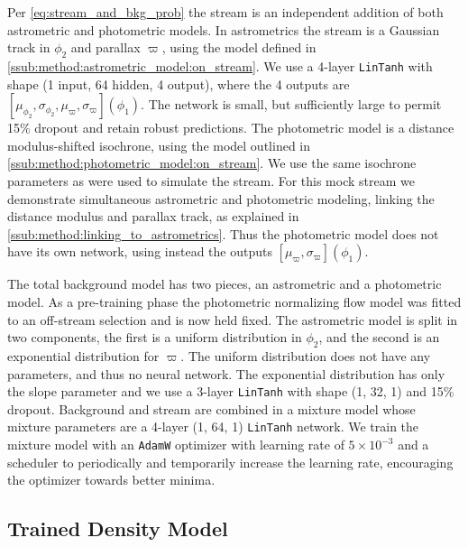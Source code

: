 \documentclass[twocolumn]{aastex631}
\begin{document}
        Per \autoref{eq:stream_and_bkg_prob} the stream is an independent
        addition of both astrometric and photometric models.
        In astrometrics the stream is a Gaussian track in $\phi_2$ and
        parallax $\varpi$, using the model defined in
        \autoref{ssub:method:astrometric_model:on_stream}. We use a 4-layer 
        \texttt{LinTanh} with shape (1 input, 64 hidden, 4 output), where the 4 outputs
        are $[\mu_{\phi_2}, \sigma_{\phi_2}, \mu_{\varpi}, \sigma_{\varpi}](\phi_1)$.
        The network is small, but sufficiently large to permit 15\% dropout and retain
        robust predictions.
        The photometric model is a distance modulus-shifted isochrone, using the model
        outlined in  \autoref{ssub:method:photometric_model:on_stream}. We use the
        same isochrone parameters as were used to simulate the stream. For this mock
        stream we demonstrate simultaneous astrometric and photometric modeling, linking
        the distance modulus and parallax track, as explained in
        \autoref{ssub:method:linking_to_astrometrics}. Thus the photometric model
        does not have its own network, using instead the outputs
        $[\mu_{\varpi}, \sigma_{\varpi}](\phi_1)$.

        The total background model has two pieces, an astrometric and a photometric model.
        As a pre-training phase the photometric normalizing flow model was fitted to
        an off-stream selection and is now held fixed. The astrometric model
        is split in two components, the first is a uniform distribution
        in $\phi_2$, and the second is an exponential distribution for $\varpi$.
        The uniform distribution does not have any parameters, and thus no neural network.
        The exponential distribution has only the slope parameter and we use a 3-layer 
        \texttt{LinTanh} with shape (1, 32, 1) and 15\% dropout. Background and
        stream are combined in a mixture model whose mixture parameters are a 4-layer 
        (1, 64, 1) \texttt{LinTanh} network. We train the mixture model with an
        \texttt{AdamW} optimizer with learning rate of $5\times10^{-3}$ and a scheduler
        to periodically and temporarily increase the learning rate, encouraging the optimizer
        towards better minima.

    \subsection{Trained Density Model} \label{sub:results_mock:results}
\end{document}
